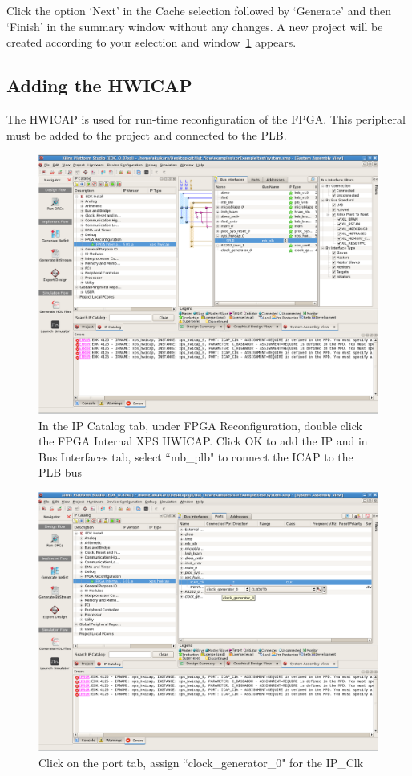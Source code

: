 \documentclass[a4paper,oneside]{memoir}
\begin{document}
Click the option `Next' in the Cache selection followed by `Generate' and then `Finish' in the summary window without any changes. A new project will be created according to your selection and window~\ref{fig:step9} appears.

\subsection{Adding the HWICAP}\label{sec:adding_hwicap_blaze}
The HWICAP is used for run-time reconfiguration of the FPGA. This peripheral must be added to the project and connected to the PLB.

\begin{figure}[H]
\centering
\includegraphics[scale=0.4]{step9}
\caption{In the IP Catalog tab, under FPGA Reconfiguration, double click the FPGA Internal XPS HWICAP. Click OK to add the IP and in Bus Interfaces tab, select ``mb\_plb" to connect the ICAP to the PLB bus\label{fig:step9}}
\end{figure}
\begin{figure}[H]
\centering
\includegraphics[scale=0.4]{step10}
\caption{Click on the port tab, assign ``clock\_generator\_0" for the IP\_Clk\label{fig:step10}}
\end{figure}
\end{document}
